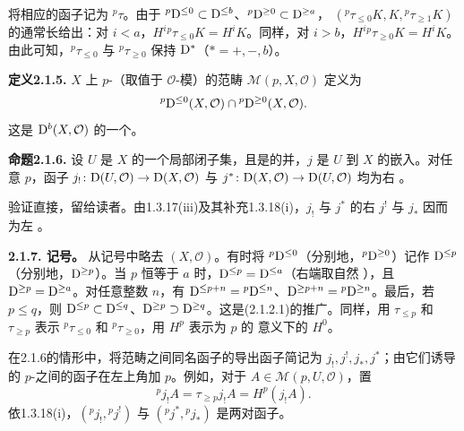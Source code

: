 将相应的函子记为 ${}^p\tau$。由于 ${}^p\mathrm{D}^{\leq0}\subset\mathrm{D}^{\leq b}$、${}^p\mathrm{D}^{\geq0}\subset\mathrm{D}^{\geq a}$， $({}^p\tau_{\leq0}K,K,{}^p\tau_{\geq1}K)$ 的通常长给出：对 $i<a$，$H^i{}^p\tau_{\leq0}K=H^iK$。同样，对 $i>b$，$H^i{}^p\tau_{\geq0}K=H^iK$。由此可知，${}^p\tau_{\leq0}$ 与 ${}^p\tau_{\geq0}$
保持 $\mathrm{D}^*$（$*=+,-,b$）。

\par\medskip\noindent\textbf{定义2.1.5.} $X$ 上 $p$-（取值于 $\mathcal O$-模）的范畴 $\mathcal M(p,X,\mathcal O)$ 定义为
\[
 {}^p\mathrm{D}^{\leq0}(X,\mathcal O)\cap{}^p\mathrm{D}^{\geq0}(X,\mathcal O).
\]
这是 $\mathrm{D}^b(X,\mathcal O)$ 的一个。

\par\medskip\noindent\textbf{命题2.1.6.} 设 $U$ 是 $X$ 的一个局部闭子集，且是的并，$j$ 是 $U$ 到 $X$ 的嵌入。对任意 $p$，函子 $j_!\colon\mathrm{D}(U,\mathcal O)\to\mathrm{D}(X,\mathcal O)$ 与 $j^*\colon\mathrm{D}(X,\mathcal O)\to\mathrm{D}(U,\mathcal O)$ 均为右 。

验证直接，留给读者。由1.3.17(iii)及其补充1.3.18(i)，$j_!$ 与 $j^*$ 的右 $j^!$ 与 $j_*$ 因而为左 。

\par\medskip\noindent\textbf{2.1.7. 记号。} 从记号中略去 $(X,\mathcal O)$。有时将 ${}^p\mathrm{D}^{\leq0}$（分别地，${}^p\mathrm{D}^{\geq0}$）记作 $\mathrm{D}^{\leq p}$（分别地，$\mathrm{D}^{\geq p}$）。当 $p$ 恒等于 $a$ 时，$\mathrm{D}^{\leq p}=\mathrm{D}^{\leq a}$（右端取自然 ），且 $\mathrm{D}^{\geq p}=\mathrm{D}^{\geq a}$。对任意整数 $n$，有 $\mathrm{D}^{\leq p+n}={}^p\mathrm{D}^{\leq n}$、$\mathrm{D}^{\geq p+n}={}^p\mathrm{D}^{\geq n}$。最后，若 $p\leq q$，则 $\mathrm{D}^{\leq p}\subset\mathrm{D}^{\leq q}$、$\mathrm{D}^{\geq p}\supset\mathrm{D}^{\geq q}$。这是(2.1.2.1)的推广。同样，用 $\tau_{\leq p}$ 和 $\tau_{\geq p}$ 表示 ${}^p\tau_{\leq0}$ 和 ${}^p\tau_{\geq0}$，用 $H^p$ 表示为 $p$ 的 意义下的 $H^0$。

在2.1.6的情形中，将范畴之间同名函子的导出函子简记为 $j_!,j^!,j_*,j^*$；由它们诱导的 $p$-之间的函子在左上角加 $p$。例如，对于 $A\in\mathcal M(p,U,\mathcal O)$，置
\[
 {}^pj_!A=\tau_{\geq p}j_!A=H^p(j_!A).
\]
依1.3.18(i)，$({}^pj_!,{}^pj^!)$ 与 $({}^pj^*,{}^pj_*)$ 是两对函子。


